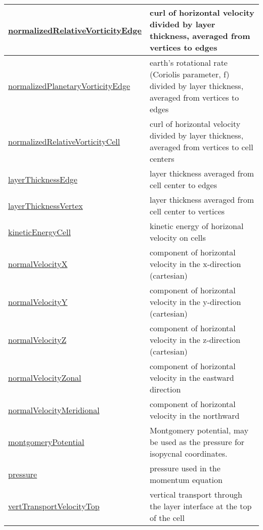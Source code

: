 {\begin{center}
\begin{longtable}{| p{2.0in} | p{4.0in} |}
	\hline
	\hyperref[subsec:var_sec_state_normalizedRelativeVorticityEdge]{normalizedRelativeVorticityEdge} & curl of horizontal velocity divided by layer thickness, averaged from vertices to edges \\
	\hline
	\hyperref[subsec:var_sec_state_normalizedPlanetaryVorticityEdge]{normalizedPlanetaryVorticityEdge} & earth's rotational rate (Coriolis parameter, f) divided by layer thickness, averaged from vertices to edges \\
	\hline
	\hyperref[subsec:var_sec_state_normalizedRelativeVorticityCell]{normalizedRelativeVorticityCell} & curl of horizontal velocity divided by layer thickness, averaged from vertices to cell centers \\
	\hline
	\hyperref[subsec:var_sec_state_layerThicknessEdge]{layerThicknessEdge} & layer thickness averaged from cell center to edges \\
	\hline
	\hyperref[subsec:var_sec_state_layerThicknessVertex]{layerThicknessVertex} & layer thickness averaged from cell center to vertices \\
	\hline
	\hyperref[subsec:var_sec_state_kineticEnergyCell]{kineticEnergyCell} & kinetic energy of horizonal velocity on cells \\
	\hline
	\hyperref[subsec:var_sec_state_normalVelocityX]{normalVelocityX} & component of horizontal velocity in the x-direction (cartesian) \\
	\hline
	\hyperref[subsec:var_sec_state_normalVelocityY]{normalVelocityY} & component of horizontal velocity in the y-direction (cartesian) \\
	\hline
	\hyperref[subsec:var_sec_state_normalVelocityZ]{normalVelocityZ} & component of horizontal velocity in the z-direction (cartesian) \\
	\hline
	\hyperref[subsec:var_sec_state_normalVelocityZonal]{normalVelocityZonal} & component of horizontal velocity in the eastward direction \\
	\hline
	\hyperref[subsec:var_sec_state_normalVelocityMeridional]{normalVelocityMeridional} & component of horizontal velocity in the northward \\
	\hline
	\hyperref[subsec:var_sec_state_montgomeryPotential]{montgomeryPotential} & Montgomery potential, may be used as the pressure for isopycnal coordinates. \\
	\hline
	\hyperref[subsec:var_sec_state_pressure]{pressure} & pressure used in the momentum equation \\
	\hline
	\hyperref[subsec:var_sec_state_vertTransportVelocityTop]{vertTransportVelocityTop} & vertical transport through the layer interface at the top of the cell \\

\end{longtable}
\end{center}}
